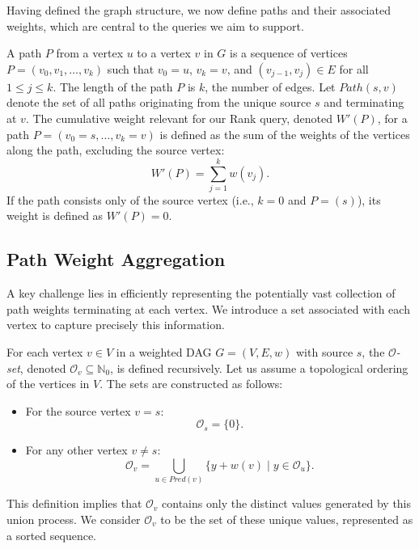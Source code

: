 Having defined the graph structure, we now define paths and their associated weights, which are central to the queries we aim to support.

\begin{definition}
    \label{def:paths_weights}
    A path $P$ from a vertex $u$ to a vertex $v$ in $G$ is a sequence of vertices $P = (v_0, v_1, \dots, v_k)$ such that $v_0 = u$, $v_k = v$, and $(v_{j-1}, v_j) \in E$ for all $1 \le j \le k$. The length of the path $P$ is $k$, the number of edges. Let $Path(s, v)$ denote the set of all paths originating from the unique source $s$ and terminating at $v$. The cumulative weight relevant for our Rank query, denoted $W'(P)$, for a path $P=(v_0=s, \dots, v_k=v)$ is defined as the sum of the weights of the vertices along the path, excluding the source vertex:
    \[ W'(P) = \sum_{j=1}^{k} w(v_j). \]
    If the path consists only of the source vertex (i.e., $k=0$ and $P=(s)$), its weight is defined as $W'(P)=0$.
\end{definition}

\subsection{Path Weight Aggregation}
\label{subsec:o_set_def}

A key challenge lies in efficiently representing the potentially vast collection of path weights terminating at each vertex. We introduce a set associated with each vertex to capture precisely this information.

\begin{definition}
    \label{def:o_set}
    For each vertex $v \in V$ in a weighted DAG $G=(V, E, w)$ with source $s$, the \emph{$\mathcal{O}$-set}, denoted $\mathcal{O}_v \subseteq \mathbb{N}_0$, is defined recursively. Let us assume a topological ordering of the vertices in $V$. The sets are constructed as follows:
    \begin{itemize}
        \item For the source vertex $v = s$:
              \[ \mathcal{O}_s = \{0\}. \]
        \item For any other vertex $v \neq s$:
              \[ \mathcal{O}_v = \bigcup_{u \in Pred(v)} \{ y + w(v) \mid y \in \mathcal{O}_u \}. \]
    \end{itemize}
\end{definition}
This definition implies that $\mathcal{O}_v$ contains only the distinct values generated by this union process. We consider $\mathcal{O}_v$ to be the set of these unique values, represented as a sorted sequence.

